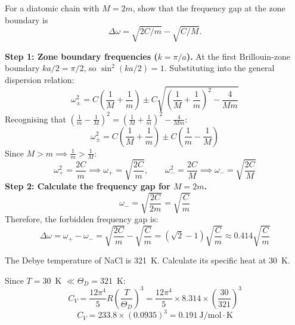 \documentclass[11pt,a4paper]{article}
\begin{document}
\begin{probbox}[Problem 2]
For a diatomic chain with $M=2m$, show that the frequency gap at the zone boundary is
\[
\Delta\omega = \sqrt{2C/m} - \sqrt{C/M}.
\]
\end{probbox}
\begin{solbox}
\textbf{Step 1: Zone boundary frequencies ($k = \pi/a$).}
At the first Brillouin-zone boundary $ka/2 = \pi/2$, so $\sin^2(ka/2) = 1$. Substituting into the general dispersion relation:
\[
\omega_\pm^2 = C\left(\frac{1}{M}+\frac{1}{m}\right) \pm C\sqrt{\left(\frac{1}{M}+\frac{1}{m}\right)^2 - \frac{4}{Mm}}
\]
Recognising that $\left(\frac{1}{m} - \frac{1}{M}\right)^2 = \left(\frac{1}{M}+\frac{1}{m}\right)^2 - \frac{4}{Mm}$:
\[
\omega_\pm^2 = C\left(\frac{1}{M}+\frac{1}{m}\right) \pm C\left(\frac{1}{m} - \frac{1}{M}\right)
\]
Since $M > m \implies \frac{1}{m} > \frac{1}{M}$:
\[
\omega_+^2 = \frac{2C}{m} \implies \omega_+ = \sqrt{\frac{2C}{m}}, \qquad
\omega_-^2 = \frac{2C}{M} \implies \omega_- = \sqrt{\frac{2C}{M}}
\]
\textbf{Step 2: Calculate the frequency gap for $M = 2m$.}
\[
\omega_- = \sqrt{\frac{2C}{2m}} = \sqrt{\frac{C}{m}}
\]
Therefore, the forbidden frequency gap is:
\[
\Delta\omega = \omega_+ - \omega_- = \sqrt{\frac{2C}{m}} - \sqrt{\frac{C}{m}} = \left(\sqrt{2}-1\right)\sqrt{\frac{C}{m}} \approx 0.414\sqrt{\frac{C}{m}}
\]
\end{solbox}

\begin{probbox}[Problem 3]
The Debye temperature of NaCl is 321~K. Calculate its specific heat at 30~K.
\end{probbox}
\begin{solbox}
Since $T=30$~K $\ll \Theta_D=321$~K:
\[
C_V = \frac{12\pi^4}{5}R\left(\frac{T}{\Theta_D}\right)^3
= \frac{12\pi^4}{5}\times8.314\times\left(\frac{30}{321}\right)^3
\]
\[
C_V = 233.8 \times (0.0935)^3 = 0.191\ \text{J/mol}\cdot\text{K}
\]
\end{solbox}
\end{document}
